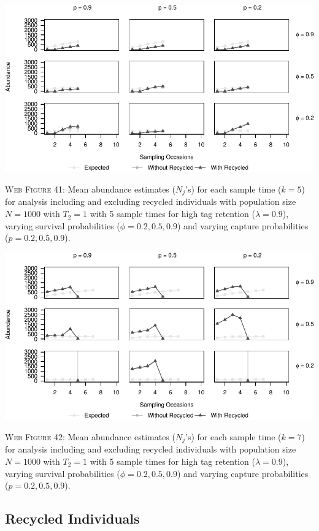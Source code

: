 \documentclass[]{article}
\begin{document}
\newpage

\includegraphics{Appendix_BW_files/figure-latex/41_abundance_H_GJSTL5-1.pdf}

\textsc{Web Figure 41:} Mean abundance estimates (\(N_j\)'s) for each
sample time (\(k=5\)) for analysis including and excluding recycled
individuals with population size \(N=1000\) with \(T_2=1\) with 5 sample times for high tag retention (\(\lambda=0.9\)), varying survival
probabilities (\(\phi=0.2,0.5,0.9\)) and varying capture probabilities
(\(p=0.2,0.5,0.9\)).

\includegraphics{Appendix_BW_files/figure-latex/42_abundance_H_GJSTL6-1.pdf}

\textsc{Web Figure 42:} Mean abundance estimates (\(N_j\)'s) for each
sample time (\(k=7\)) for analysis including and excluding recycled
individuals with population size \(N=1000\) with \(T_2=1\) with 5 sample times for high tag retention (\(\lambda=0.9\)), varying survival
probabilities (\(\phi=0.2,0.5,0.9\)) and varying capture probabilities
(\(p=0.2,0.5,0.9\)).

\newpage

\subsection{Recycled Individuals}\label{recycled-individuals}
\end{document}
